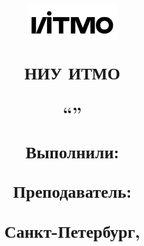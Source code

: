 \begin{titlepage}

\thispagestyle{empty}

\title{

\includegraphics[width=4cm]{media/ITMO_logo.png} 

НИУ ИТМО 
\vspace{4em}

\begin{center}
\large\textsc{\textbf{\name}}

\vspace{1em}
``\subname'' 

\end{center}

\vspace{3em}

\begin{flushright}
\normalsize{ 
Выполнили: \\ \textbf{\madeby} 

Преподаватель: \\ \textbf{\teacher} 
}
\end{flushright}	

\vfill

\begin{center}
\small{Санкт-Петербург, \the\year}
\end{center}
}


\author{}
\date{}
\maketitle
\thispagestyle{empty}
\end{titlepage}
